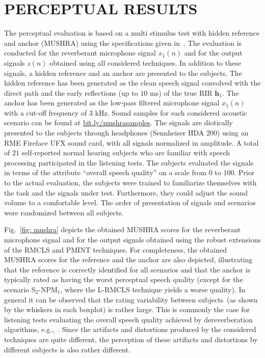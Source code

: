 \documentclass[fleqn]{aes2e}
\begin{document}
\section{PERCEPTUAL RESULTS}
\label{sec: mushra}
The perceptual evaluation is based on a multi stimulus test with hidden reference and anchor (MUSHRA) using the specifications given in~\cite{MUSHRA}.
The evaluation is conducted for the reverberant microphone signal $x_1(n)$ and for the output signals $z(n)$ obtained using all considered techniques.
In addition to these signals, a hidden reference and an anchor are presented to the subjects. 
The hidden reference has been generated as the clean speech signal convolved with the direct path and the early reflections (up to $10$ ms) of the true RIR $\mathbf{h}_1$.
The anchor has been generated as the low-pass filtered microphone signal $x_1(n)$  with a cut-off frequency of $3$ kHz.
Sound samples for each considered acoustic scenario can be found at \url{bit.ly/mushrasamples}.
The signals are diotically presented to the subjects through headphones (Sennheiser HDA 200) using an RME Fireface UFX sound card, with all signals normalized in amplitude.
A total of $21$ self-reported normal hearing subjects who are familiar with speech processing participated in the listening tests.
The subjects evaluated the signals in terms of the attribute ``overall speech quality'' on a scale from $0$ to $100$. 
Prior to the actual evaluation, the subjects were trained to familiarize themselves with the task and the signals under test.
Furthermore, they could adjust the sound volume to a comfortable level.
The order of presentation of signals and scenarios were randomized between all subjects.

Fig.~\ref{fig: mushra} depicts the obtained MUSHRA scores for the reverberant microphone signal and for the output signals obtained using the robust extensions of the RMCLS and PMINT techniques.
For completeness, the obtained MUSHRA scores for the reference and the anchor are also depicted, illustrating that the reference is correctly identified for all scenarios and that the anchor is typically rated as having the worst perceptual speech quality (except for the scenario S$_2$-NPM$_1$, where the L-RMCLS technique yields a worse quality).
In general it can be observed that the rating variability between subjects~(as shown by the whiskers in each boxplot) is rather large. 
This is commonly the case for listening tests evaluating the overall speech quality achieved by dereverberation algorithms, e.g.,~\cite{Cauchi_EURASIP_2015,Warzybok_IWAENC_2014,Goetze_JAES_2014}.
Since the artifacts and distortions produced by the considered techniques are quite different, the perception of these artifacts and distortions by different subjects is also rather different.
\end{document}
